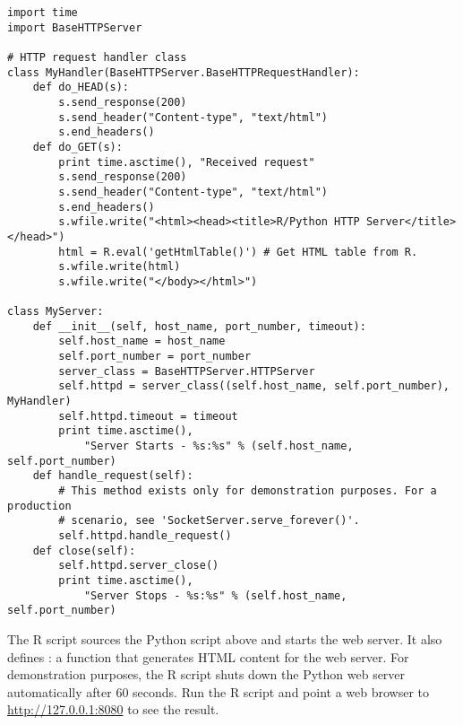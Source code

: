\begin{verbatim}
import time
import BaseHTTPServer

# HTTP request handler class
class MyHandler(BaseHTTPServer.BaseHTTPRequestHandler):
    def do_HEAD(s):
        s.send_response(200)
        s.send_header("Content-type", "text/html")
        s.end_headers()
    def do_GET(s):
        print time.asctime(), "Received request"
        s.send_response(200)
        s.send_header("Content-type", "text/html")
        s.end_headers()
        s.wfile.write("<html><head><title>R/Python HTTP Server</title></head>")
        html = R.eval('getHtmlTable()') # Get HTML table from R.
        s.wfile.write(html)
        s.wfile.write("</body></html>")

class MyServer:
    def __init__(self, host_name, port_number, timeout):
        self.host_name = host_name
        self.port_number = port_number
        server_class = BaseHTTPServer.HTTPServer
        self.httpd = server_class((self.host_name, self.port_number), MyHandler)
        self.httpd.timeout = timeout
        print time.asctime(),
            "Server Starts - %s:%s" % (self.host_name, self.port_number)
    def handle_request(self):
        # This method exists only for demonstration purposes. For a production 
        # scenario, see 'SocketServer.serve_forever()'.
        self.httpd.handle_request()
    def close(self):
        self.httpd.server_close()
        print time.asctime(),
            "Server Stops - %s:%s" % (self.host_name, self.port_number)
\end{verbatim}

The R script sources the Python script above and starts the web server. It also defines : a function that generates HTML content for the web server. For demonstration purposes, the R script shuts down the Python web server automatically after 60 seconds. Run the R script and point a web browser to \url{http://127.0.0.1:8080} to see the result.

